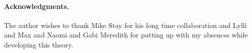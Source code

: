 \paragraph{Acknowledgments.}
The author wishes to thank Mike Stay for his long time collaboration
and Lylli and Max and Naomi and Gabi Meredith for putting up with my absences
while developing this theory.

